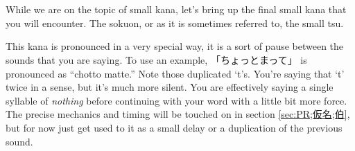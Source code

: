 \section[促音]{}\label{sec:PR;仮名;促音}

While we are on the topic of small kana, let's bring up the final small kana that you will encounter. The sokuon, or as it is sometimes referred to, the small tsu.

This kana is pronounced in a very special way, it is a sort of pause between the sounds that you are saying. To use an example, 「ちょっとまって」 is pronounced as ``chotto matte.'' Note those duplicated `t's. You're saying that `t' twice in a sense, but it's much more silent. You are effectively saying a single syllable of \textit{nothing} before continuing with your word with a little bit more force. The precise mechanics and timing will be touched on in section \ref{sec:PR;仮名;伯}, but for now just get used to it as a small delay or a duplication of the previous sound.